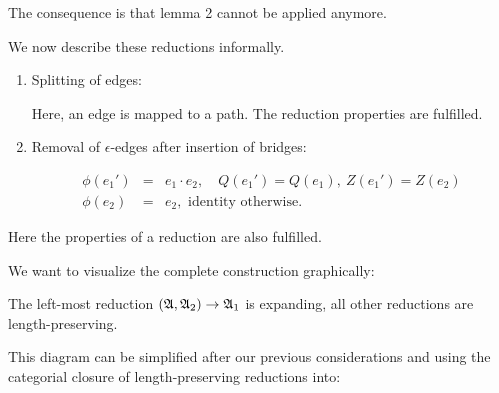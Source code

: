 The consequence is that lemma 2 cannot be applied anymore.

We now describe these reductions informally.

\begin{enumerate}
  \item Splitting of edges:
  \begin{center}
  
  \end{center}
  Here, an edge is mapped to a path. The reduction properties are fulfilled.

  \item Removal of $\epsilon$-edges after insertion of bridges:
  \begin{center}
  
  \end{center}
  
  \begin{eqnarray*}
  \phi(e_1') &=& e_1 \cdot e_2,\quad Q(e_1') = Q(e_1),\ Z(e_1') = Z(e_2) \\
  \phi(e_2) &=& e_2,\text{ identity otherwise.}
  \end{eqnarray*}
\end{enumerate}

Here the properties of a reduction are also fulfilled.

\medskip
We want to visualize the complete construction graphically:

\begin{center}
\end{center}

The left-most reduction $(\mbox{$\mathfrak{A}$}, \mbox{$\mathfrak{A}$}_2) \to \mbox{$\mathfrak{A}$}_1$ is expanding, all
other reductions are length-preserving.

This diagram can be simplified after our previous considerations and using the
categorial closure of length-preserving reductions into:

\begin{center}
\end{center}

